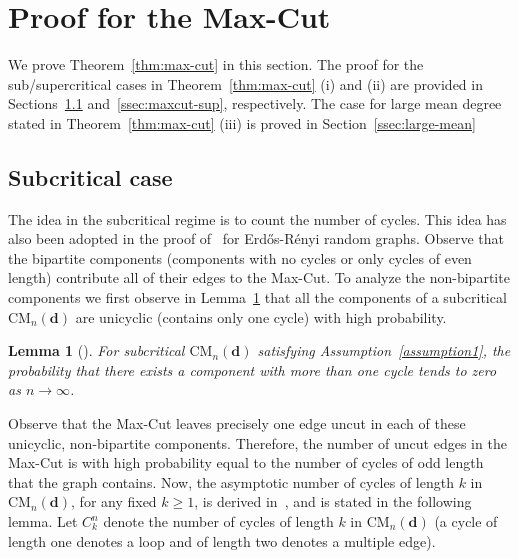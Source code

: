 \documentclass[11pt,a4paper, reqno]{article}
\numberwithin{equation}{section}
\numberwithin{equation}{section}
\newcommand{\1}{\ensuremath{\mathbbm{1}}}
\newcommand{\CM}{\ensuremath{\mathrm{CM}_n(\boldsymbol{d})}}
\newtheorem{lemma}[theorem]{Lemma}
\numberwithin{equation}{section}
\numberwithin{theorem}{section}
\begin{document}
\section{Proof for the Max-Cut}
\label{sec:proof_maxcut}
We prove Theorem~\ref{thm:max-cut} in this section.
The proof for the sub/supercritical cases in Theorem~\ref{thm:max-cut} (i) and (ii) are provided in Sections~\ref{ssec:maxcut-sub} and~\ref{ssec:maxcut-sup}, respectively.
The case for large mean degree stated in Theorem~\ref{thm:max-cut} (iii) is proved in Section~\ref{ssec:large-mean}  

\subsection{Subcritical case}\label{ssec:maxcut-sub}
The idea in the subcritical regime is to count the number of cycles.
This idea has also been adopted in the proof of~\cite[Theorem 19]{CGHS04} for Erd\H{o}s-R\'enyi random graphs.
Observe that the bipartite components (components with no cycles or only cycles of even length) contribute all of their edges to the Max-Cut.
To analyze the non-bipartite components we first observe in Lemma~\ref{lem:all-unicyclic-comp} that all the components of a subcritical $\CM$ are unicyclic (contains only one cycle) with high probability. 
%
%
%
%
%
\begin{lemma}[{\cite[Theorem~1.2~(b)]{HM2012}}] \label{lem:all-unicyclic-comp}
For subcritical $\CM$ satisfying {\rm Assumption~\ref{assumption1}}, the probability that there exists a component with more than one cycle tends to zero as $n\to\infty$.
\end{lemma}
Observe that  the Max-Cut leaves precisely one edge uncut in each of these unicyclic, non-bipartite components.
Therefore, the number of uncut edges in the Max-Cut is with high probability equal to the number of cycles of odd length that the graph contains.
Now, the asymptotic number of cycles of length $k$ in $\CM$, for any fixed $k\geq 1$, is derived in~\cite[Theorem 2.18]{B2012}, and is stated in the following lemma.
Let $C_k^n$ denote the number of cycles of length $k$ in $\CM$ (a cycle of length one denotes a loop and of length two denotes a multiple edge).
\end{document}
